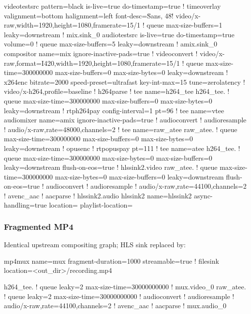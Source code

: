 \documentclass{article}
\let\originalfootnotesize\footnotesize
\let\oldverbatim\verbatim
\let\oldendverbatim\endverbatim
\renewenvironment{verbatim}{\originalfootnotesize\oldverbatim}{\oldendverbatim}
\begin{document}
\begin{verbatim}
videotestsrc pattern=black is-live=true do-timestamp=true !
timeoverlay valignment=bottom halignment=left font-desc=\"Sans, 48\" !
video/x-raw,width=1920,height=1080,framerate=15/1 ! queue max-size-buffers=1 leaky=downstream !
mix.sink_0 audiotestsrc is-live=true do-timestamp=true volume=0 !
queue max-size-buffers=5 leaky=downstream !
amix.sink_0 compositor name=mix ignore-inactive-pads=true ! videoconvert !
video/x-raw,format=I420,width=1920,height=1080,framerate=15/1 !
queue max-size-time=300000000 max-size-buffers=0 max-size-bytes=0 leaky=downstream !
x264enc bitrate=2000 speed-preset=ultrafast key-int-max=15 tune=zerolatency !
video/x-h264,profile=baseline ! h264parse ! tee name=h264_tee h264_tee. !
queue max-size-time=300000000 max-size-buffers=0 max-size-bytes=0 leaky=downstream !
rtph264pay config-interval=1 pt=96 ! tee name=vtee audiomixer name=amix ignore-inactive-pads=true !
audioconvert ! audioresample ! audio/x-raw,rate=48000,channels=2 ! tee name=raw_atee raw_atee. !
queue max-size-time=300000000 max-size-buffers=0 max-size-bytes=0 leaky=downstream !
opusenc ! rtpopuspay pt=111 ! tee name=atee h264_tee. !
queue max-size-time=300000000 max-size-bytes=0 max-size-buffers=0 leaky=downstream flush-on-eos=true !
hlssink2.video raw_atee. !
queue max-size-time=300000000 max-size-bytes=0 max-size-buffers=0 leaky=downstream flush-on-eos=true !
audioconvert ! audioresample ! audio/x-raw,rate=44100,channels=2 ! avenc_aac ! aacparse !
hlssink2.audio hlssink2 name=hlssink2 async-handling=true location=%s/segment_%" G_GINT64_FORMAT "_%%05d.ts
playlist-location=%s/index.m3u8 target-duration=2 max-files=0 playlist-length=10
\end{verbatim}

\subsubsection{Fragmented MP4}

Identical upstream compositing graph; HLS sink replaced by:

\begin{verbatim}
mp4mux name=mux fragment-duration=1000 streamable=true !
  filesink location=<out_dir>/recording.mp4

h264_tee. ! queue leaky=2 max-size-time=30000000000 ! mux.video_0
raw_atee. ! queue leaky=2 max-size-time=30000000000 !
  audioconvert ! audioresample ! audio/x-raw,rate=44100,channels=2 !
  avenc_aac ! aacparse ! mux.audio_0
\end{verbatim}
\end{document}
